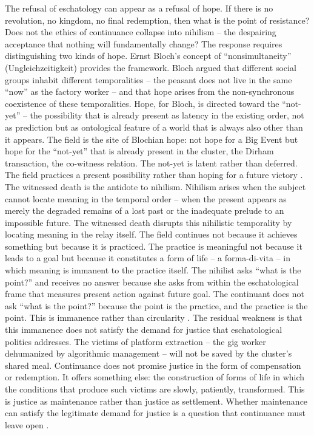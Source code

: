 The refusal of eschatology can appear as a refusal of hope. If there is no revolution, no kingdom, no final redemption, then what is the point of resistance? Does not the ethics of continuance collapse into nihilism – the despairing acceptance that nothing will fundamentally change? The response requires distinguishing two kinds of hope. Ernst Bloch’s concept of “nonsimultaneity” (Ungleichzeitigkeit) provides the framework. Bloch argued that different social groups inhabit different temporalities – the peasant does not live in the same “now” as the factory worker – and that hope arises from the non-synchronous coexistence of these temporalities. Hope, for Bloch, is directed toward the “not-yet” – the possibility that is already present as latency in the existing order, not as prediction but as ontological feature of a world that is always also other than it appears. The field is the site of Blochian hope: not hope for a Big Event but hope for the “not-yet” that is already present in the cluster, the Dirham transaction, the co-witness relation. The not-yet is latent rather than deferred. The field practices a present possibility rather than hoping for a future victory \cite[pp.~96-116]{bloch_1935}. The witnessed death is the antidote to nihilism. Nihilism arises when the subject cannot locate meaning in the temporal order – when the present appears as merely the degraded remains of a lost past or the inadequate prelude to an impossible future. The witnessed death disrupts this nihilistic temporality by locating meaning in the relay itself. The field continues not because it achieves something but because it is practiced. The practice is meaningful not because it leads to a goal but because it constitutes a form of life – a forma-di-vita – in which meaning is immanent to the practice itself. The nihilist asks “what is the point?” and receives no answer because she asks from within the eschatological frame that measures present action against future goal. The continuant does not ask “what is the point?” because the point is the practice, and the practice is the point. This is immanence rather than circularity \cite{agamben_2013}. The residual weakness is that this immanence does not satisfy the demand for justice that eschatological politics addresses. The victims of platform extraction – the gig worker dehumanized by algorithmic management – will not be saved by the cluster’s shared meal. Continuance does not promise justice in the form of compensation or redemption. It offers something else: the construction of forms of life in which the conditions that produce such victims are slowly, patiently, transformed. This is justice as maintenance rather than justice as settlement. Whether maintenance can satisfy the legitimate demand for justice is a question that continuance must leave open \cite{bloch_1935}.

